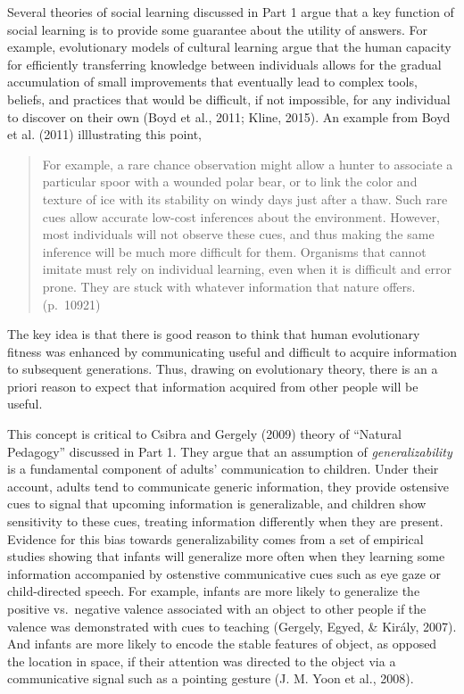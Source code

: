 \documentclass[english,floatsintext,man]{apa6}
\theoremstyle{definition}
\theoremstyle{definition}
\theoremstyle{definition}
\theoremstyle{remark}
\begin{document}
Several theories of social learning discussed in Part 1 argue that a key
function of social learning is to provide some guarantee about the
utility of answers. For example, evolutionary models of cultural
learning argue that the human capacity for efficiently transferring
knowledge between individuals allows for the gradual accumulation of
small improvements that eventually lead to complex tools, beliefs, and
practices that would be difficult, if not impossible, for any individual
to discover on their own (Boyd et al., 2011; Kline, 2015). An example
from Boyd et al. (2011) illlustrating this point,

\begin{quote}
For example, a rare chance observation might allow a hunter to associate
a particular spoor with a wounded polar bear, or to link the color and
texture of ice with its stability on windy days just after a thaw. Such
rare cues allow accurate low-cost inferences about the environment.
However, most individuals will not observe these cues, and thus making
the same inference will be much more difficult for them. Organisms that
cannot imitate must rely on individual learning, even when it is
difficult and error prone. They are stuck with whatever information that
nature offers. (p.~10921)
\end{quote}

\noindent
The key idea is that there is good reason to think that human
evolutionary fitness was enhanced by communicating useful and difficult
to acquire information to subsequent generations. Thus, drawing on
evolutionary theory, there is an a priori reason to expect that
information acquired from other people will be useful.

This concept is critical to Csibra and Gergely (2009) theory of
\enquote{Natural Pedagogy} discussed in Part 1. They argue that an
assumption of \emph{generalizability} is a fundamental component of
adults' communication to children. Under their account, adults tend to
communicate generic information, they provide ostensive cues to signal
that upcoming information is generalizable, and children show
sensitivity to these cues, treating information differently when they
are present. Evidence for this bias towards generalizability comes from
a set of empirical studies showing that infants will generalize more
often when they learning some information accompanied by ostenstive
communicative cues such as eye gaze or child-directed speech. For
example, infants are more likely to generalize the positive vs.~negative
valence associated with an object to other people if the valence was
demonstrated with cues to teaching (Gergely, Egyed, \& Király, 2007).
And infants are more likely to encode the stable features of object, as
opposed the location in space, if their attention was directed to the
object via a communicative signal such as a pointing gesture (J. M. Yoon
et al., 2008).
\end{document}
